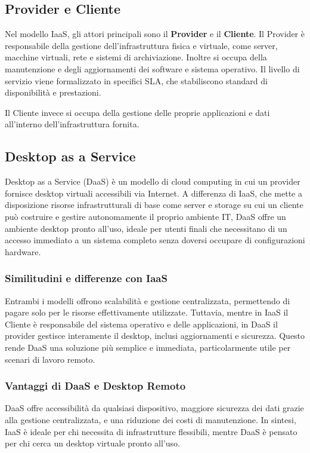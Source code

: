 \documentclass[12pt,a4paper,openright,twoside]{book}
\begin{document}
\subsection{Provider e Cliente}
\label{subsec:provider_cliente}
Nel modello \ac{IaaS}, gli attori principali sono il \textbf{Provider} e il \textbf{Cliente}. Il Provider è responsabile della gestione dell'infrastruttura fisica e virtuale, come server, macchine virtuali, rete e sistemi di archiviazione. Inoltre si occupa della manutenzione e degli aggiornamenti dei software e sistema operativo\cite{bhardwaj2010cloud}.
Il livello di servizio viene formalizzato in specifici \ac{SLA}, che stabiliscono standard di disponibilità e prestazioni.

Il Cliente invece si occupa della gestione delle proprie applicazioni e dati all'interno dell'infrastruttura fornita\cite{bhardwaj2010cloud}.

\subsection{Desktop as a Service}
\label{subsec:daas}
Desktop as a Service (DaaS) è un modello di cloud computing in cui un provider fornisce desktop virtuali accessibili via Internet. A differenza di \ac{IaaS}, che mette a disposizione risorse infrastrutturali di base come server e storage su cui un cliente può costruire e gestire autonomamente il proprio ambiente IT, DaaS offre un ambiente desktop pronto all'uso, ideale per utenti finali che necessitano di un accesso immediato a un sistema completo senza doversi occupare di configurazioni hardware.

\subsubsection{Similitudini e differenze con IaaS}
Entrambi i modelli offrono scalabilità e gestione centralizzata, permettendo di pagare solo per le risorse effettivamente utilizzate. Tuttavia, mentre in \ac{IaaS} il Cliente è responsabile del sistema operativo e delle applicazioni, in DaaS il provider gestisce interamente il desktop, inclusi aggiornamenti e sicurezza. Questo rende DaaS una soluzione più semplice e immediata, particolarmente utile per scenari di lavoro remoto.

\subsubsection{Vantaggi di DaaS e Desktop Remoto}
DaaS offre accessibilità da qualsiasi dispositivo, maggiore sicurezza dei dati grazie alla gestione centralizzata, e una riduzione dei costi di manutenzione. In sintesi, \ac{IaaS} è ideale per chi necessita di infrastrutture flessibili, mentre DaaS è pensato per chi cerca un desktop virtuale pronto all'uso.
\end{document}
